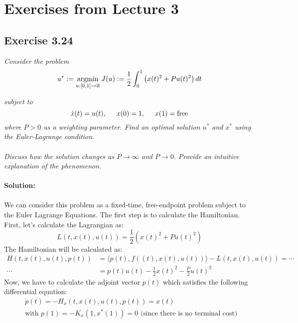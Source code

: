 \section{Exercises from Lecture 3}

\subsection{Exercise 3.24}

\emph{Consider the problem}
\begin{equation}
    u^* := \operatorname*{argmin}_{u: [0,1] \to \mathbb{R}} J(u) := \frac{1}{2} \int_0^1 \left( x(t)^2 + Pu(t)^2 \right) dt 
\end{equation}

\emph{subject to}
\begin{equation}
    \dot{x}(t) = u(t), \hspace{0.5cm} x(0) = 1, \hspace{0.5cm} x(1) = \text{free}
\end{equation}
\emph{where $P>0$ us a weighting parameter. Find an optimal solution $u^*$ and $x^*$ using the Euler-Lagrange condition.}\\
\\
\emph{Discuss how the solution changes as $P \to \infty$ and $P \to 0$. Provide an intuitive explanation of the phenomenon.}\\
\\
\textbf{Solution:}\\
\\
We can consider this problem as a fixed-time, free-endpoint problem subject to the Euler Lagrange Equations. The first step is to calculate the Hamiltonian. First, let's calculate the Lagrangian as:
\begin{equation}
    L(t, x(t), u(t)) = \frac{1}{2} \left( x(t)^2 + Pu(t)^2 \right) 
\end{equation}
The Hamiltonian will be calculated as:
\begin{align}
    H \left( t, x(t), u(t), p(t) \right) &= \langle p(t), f \left( (t), x(t), u(t) \right) \rangle - L(t, x(t), u(t)) =  \cdots \\
    \cdots &= p(t)u(t) - \frac{1}{2} x(t)^2 - \frac{P}{2}u(t)^2    
\end{align}
Now, we have to calculate the adjoint vector $p(t)$ which satisfies the following differential equation:
\begin{align}
    &\dot{p}(t) = - H_x (t,x(t), u(t), p(t)) = x(t) \\
    &\text{with } p(1) = -K_x (1, x^*(1)) = 0 \text{ (since there is no terminal cost) }
\end{align}

